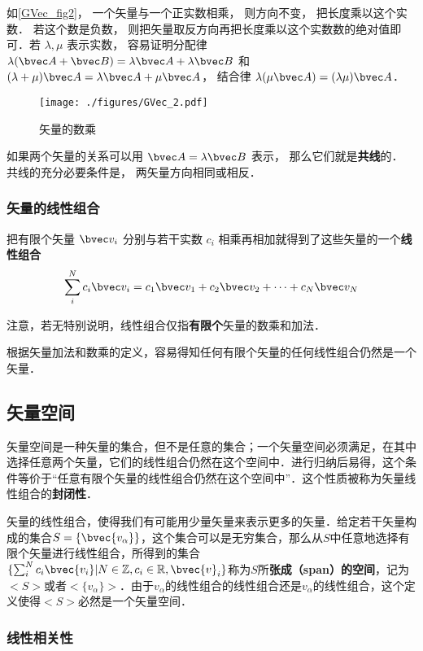 如\autoref{GVec_fig2}， 一个矢量与一个正实数相乘， 则方向不变， 把长度乘以这个实数． 若这个数是负数， 则把矢量取反方向再把长度乘以这个实数数的绝对值即可．若 $\lambda, \mu$ 表示实数， 容易证明分配律 $\lambda(\bvec A + \bvec B) = \lambda\bvec A + \lambda\bvec B$ 和 $(\lambda+\mu)\bvec A = \lambda\bvec A + \mu\bvec A$， 结合律 $\lambda(\mu\bvec A) = (\lambda\mu) \bvec A$．
\begin{figure}[ht]
\centering
\texttt{[image: ./figures/GVec\_2.pdf]}
\caption{矢量的数乘} \label{GVec_fig2}
\end{figure}

如果两个矢量的关系可以用 $\bvec A = \lambda\bvec B$ 表示， 那么它们就是\textbf{共线}的． 共线的充分必要条件是， 两矢量方向相同或相反．

\subsubsection{矢量的线性组合}
把有限个矢量 $\bvec v_i$ 分别与若干实数 $c_i$ 相乘再相加就得到了这些矢量的一个\textbf{线性组合}
\begin{equation}\label{GVec_eq1}
\sum_i^N c_i \bvec v_i = c_1\bvec v_1 + c_2\bvec v_2 +\dots +c_N \bvec v_N
\end{equation}

注意，若无特别说明，线性组合仅指\textbf{有限个}矢量的数乘和加法．

根据矢量加法和数乘的定义，容易得知任何有限个矢量的任何线性组合仍然是一个矢量．

\subsection{矢量空间}
矢量空间是一种矢量的集合，但不是任意的集合；一个矢量空间必须满足，在其中选择任意两个矢量，它们的线性组合仍然在这个空间中．进行归纳后易得，这个条件等价于“任意有限个矢量的线性组合仍然在这个空间中”．这个性质被称为矢量线性组合的\textbf{封闭性}．

矢量的线性组合，使得我们有可能用少量矢量来表示更多的矢量．给定若干矢量构成的集合$S=\{\bvec{v_\alpha}\}$，这个集合可以是无穷集合，那么从$S$中任意地选择有限个矢量进行线性组合，所得到的集合$\{\sum_i^N c_i\bvec{v_i}|N\in\mathbb{Z}, c_i\in\mathbb{R}, \bvec{v}_i\}$称为$S$所\textbf{张成（span）的空间}，记为$<S>$或者$<\{v_\alpha\}>$．由于$v_\alpha$的线性组合的线性组合还是$v_\alpha$的线性组合，这个定义使得$<S>$必然是一个矢量空间．

\subsubsection{线性相关性}

